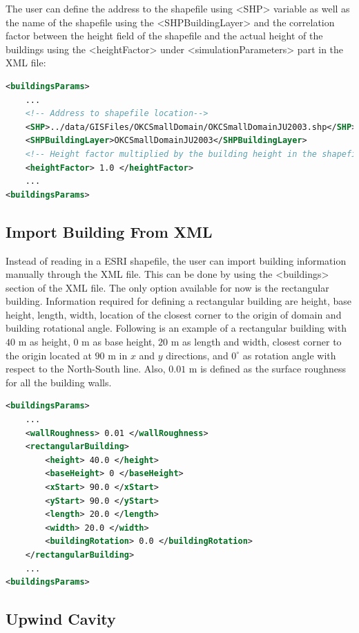 The user can define the address to the shapefile using <SHP> variable as well as the name of the shapefile using the <SHPBuildingLayer> and the correlation factor between the height field of the shapefile and the actual height of the buildings using the <heightFactor> under <simulationParameters> part in the XML file:

\begin{lstlisting}[language=XML]
<buildingsParams>
	...
	<!-- Address to shapefile location-->
	<SHP>../data/GISFiles/OKCSmallDomain/OKCSmallDomainJU2003.shp</SHP>
	<SHPBuildingLayer>OKCSmallDomainJU2003</SHPBuildingLayer>
	<!-- Height factor multiplied by the building height in the shapefile (default = 1.0)-->
	<heightFactor> 1.0 </heightFactor>
	...
<buildingsParams>
\end{lstlisting}

\subsection{Import Building From XML}
\label{sec:building}

Instead of reading in a ESRI shapefile, the user can import building information manually through the XML file. This can be done by using the <buildings> section of the XML file. The only option available for now is the rectangular building. Information required for defining a rectangular building are height, base height, length, width, location of the closest corner to the origin of domain and building rotational angle. Following is an example of a rectangular building with $40$ m as height, $0$ m as base height, $20$ m as length and width, closest corner to the origin located at $90$ m in $x$ and $y$ directions, and $0^{\circ}$ as rotation angle with respect to the North-South line. Also, $0.01$ m is defined as the surface roughness for all the building walls.

\begin{lstlisting}[language=XML]
<buildingsParams>
	...
	<wallRoughness> 0.01 </wallRoughness>
	<rectangularBuilding>
		<height> 40.0 </height>
		<baseHeight> 0 </baseHeight>
		<xStart> 90.0 </xStart>
		<yStart> 90.0 </yStart>
		<length> 20.0 </length>
		<width> 20.0 </width>
		<buildingRotation> 0.0 </buildingRotation>
	</rectangularBuilding>
	...
<buildingsParams>
\end{lstlisting}

\subsection{Upwind Cavity}\label{upwind-cavity}

